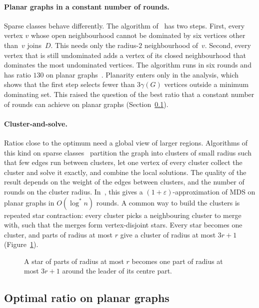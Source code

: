 \documentclass[11pt]{article}
\theoremstyle{remark}
\begin{document}
\paragraph{Planar graphs in a constant number of rounds.} Sparse classes behave differently. The
algorithm of~\cite{LOW08} has two steps. First, every vertex $v$ whose open neighbourhood cannot be
dominated by six vertices other than~$v$ joins~$D$. This needs only the radius-$2$ neighbourhood
of~$v$. Second, every vertex that is still undominated adds a vertex of its closed neighbourhood that
dominates the most undominated vertices. The algorithm runs in six rounds and has ratio $130$ on
planar graphs~\cite{LOW08}. Planarity enters only in the analysis, which shows that the first step
selects fewer than $3\gamma(G)$ vertices outside a minimum dominating set. This raised the question of the best ratio that a constant
number of rounds can achieve on planar graphs (Section~\ref{sec:optimal}).

\paragraph{Cluster-and-solve.} Ratios close to the optimum need a global view of larger regions.
Algorithms of this kind on sparse classes~\cite{CHW08,LR15} partition the graph into clusters of
small radius such that few edges run between clusters, let one vertex of every cluster collect the
cluster and solve it exactly, and combine the local solutions. The quality of the result depends on
the weight of the edges between clusters, and the number of rounds on the cluster radius.
In~\cite{CHW08}, this gives a $(1+\varepsilon)$-approximation of MDS on planar graphs in $O(\log^*n)$
rounds. A common way to build the clusters is repeated star contraction: every cluster picks a
neighbouring cluster to merge with, such that the merges form vertex-disjoint stars. Every star
becomes one cluster, and parts of radius at most $r$ give a cluster of radius at most $3r+1$
(Figure~\ref{fig:radius}).

\begin{figure}[t]\centering

\caption{A star of parts of radius at most $r$ becomes one part of radius at most $3r+1$ around the
leader of its centre part.}
\label{fig:radius}
\end{figure}

\subsection{Optimal ratio on planar graphs}\label{sec:optimal}
\end{document}
